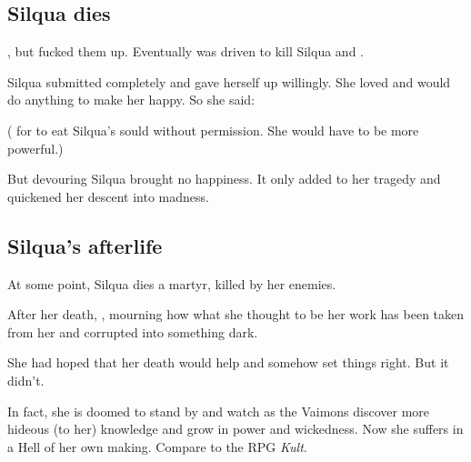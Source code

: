 \subsection{Silqua dies}
, but  fucked them up. 
Eventually \Delphine{} was driven to kill Silqua and . 

Silqua submitted completely and gave herself up willingly. 
She loved \Delphine{} and would do anything to make her happy. 
So she said: 

( for \Delphine{} to eat Silqua's sould without permission. She would have to be more powerful.)

But devouring Silqua brought \Delphine{} no happiness. 
It only added to her tragedy and quickened her descent into madness. 









\subsection{Silqua's afterlife}
At some point, Silqua dies a martyr, killed by her enemies.

After her death, , mourning how what she thought to be her work has been taken from her and corrupted into something dark.


She had hoped that her death would help and somehow set things right. 
But it didn't. 


In fact, she is doomed to stand by and watch as the Vaimons discover more hideous (to her) knowledge and grow in power and wickedness. 
Now she suffers in a Hell of her own making. 
Compare to the RPG \emph{Kult}.

